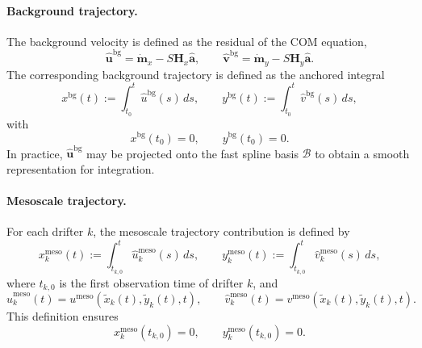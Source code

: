 \documentclass{article}
\begin{document}
\paragraph{Background trajectory.}
The background velocity is defined as the residual of the COM equation,
\begin{equation}
\hat{\mathbf{u}}^{\mathrm{bg}}
=
\dot{\mathbf{m}}_x
-
S\mathbf{H}_x\hat{\mathbf a},
\qquad
\hat{\mathbf{v}}^{\mathrm{bg}}
=
\dot{\mathbf{m}}_y
-
S\mathbf{H}_y\hat{\mathbf a}.
\end{equation}
The corresponding background trajectory is defined as the anchored integral
\begin{equation}
x^{\mathrm{bg}}(t) := \int_{t_0}^{t} \hat{u}^{\mathrm{bg}}(s)\,ds,
\qquad
y^{\mathrm{bg}}(t) := \int_{t_0}^{t} \hat{v}^{\mathrm{bg}}(s)\,ds,
\end{equation}
with
\begin{equation}
x^{\mathrm{bg}}(t_0)=0,
\qquad
y^{\mathrm{bg}}(t_0)=0.
\end{equation}
In practice, $\hat{\mathbf{u}}^{\mathrm{bg}}$ may be projected onto the fast
spline basis $\mathcal{B}$ to obtain a smooth representation for integration.

\paragraph{Mesoscale trajectory.}
For each drifter $k$, the mesoscale trajectory contribution is defined by
\begin{equation}
x_k^{\mathrm{meso}}(t)
:=
\int_{t_{k,0}}^{t}
\hat{u}_k^{\mathrm{meso}}(s)\,ds,
\qquad
y_k^{\mathrm{meso}}(t)
:=
\int_{t_{k,0}}^{t}
\hat{v}_k^{\mathrm{meso}}(s)\,ds,
\end{equation}
where $t_{k,0}$ is the first observation time of drifter $k$, and
\begin{equation}
\hat{u}_k^{\mathrm{meso}}(t)
=
u^{\mathrm{meso}}(\tilde{x}_k(t),\tilde{y}_k(t),t),
\qquad
\hat{v}_k^{\mathrm{meso}}(t)
=
v^{\mathrm{meso}}(\tilde{x}_k(t),\tilde{y}_k(t),t).
\end{equation}
This definition ensures
\begin{equation}
x_k^{\mathrm{meso}}(t_{k,0})=0,
\qquad
y_k^{\mathrm{meso}}(t_{k,0})=0.
\end{equation}
\end{document}
